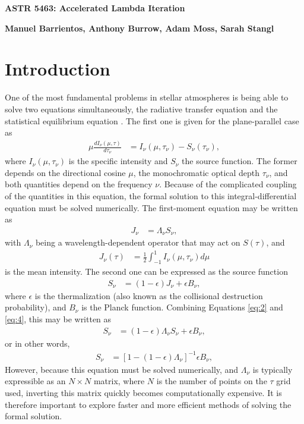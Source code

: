 \documentclass[12pt]{article}
\begin{document}
\begin{center}\begin{LARGE}
\textbf{ASTR 5463: Accelerated Lambda Iteration}
\end{LARGE}\end{center}

\begin{center}
\textbf{Manuel Barrientos, Anthony Burrow, Adam Moss, Sarah Stangl}
\end{center}


\section{Introduction}


One of the most fundamental problems in stellar atmospheres is being able to solve two equations simultaneously, the radiative transfer equation and the statistical equilibrium equation \citep[e.g.,][]{OandK1987,hubeny2003}. The first one is given for the plane-parallel case as
\begin{align}
\mu \frac{d I_\nu(\mu, \tau)}{d \tau_\nu}
&=
I_\nu(\mu, \tau_\nu) - S_\nu(\tau_\nu),
\end{align}
where $I_\nu(\mu, \tau_\nu)$ is the specific intensity and $S_\nu$ the source function. The former depends on the directional cosine $\mu$, the monochromatic optical depth $\tau_\nu$, and both quantities depend on the frequency $\nu$. Because of the complicated coupling of the quantities in this equation, the formal solution to this integral-differential equation must be solved numerically. The first-moment equation may be written as
\begin{align}
J_\nu
&=
\Lambda_\nu S_\nu,
\label{eq:2}
\end{align}
with $\Lambda_\nu$ being a wavelength-dependent operator that may act on $S(\tau)$, and
\begin{align}
J_\nu(\tau)
&=
\frac{1}{2} \int_{-1}^1 I_\nu(\mu, \tau_\nu) d\mu
\end{align}
is the mean intensity. The second one can be expressed as the source function
\begin{align}
S_\nu
&=
(1 - \epsilon) J_\nu + \epsilon B_\nu,
\label{eq:4}
\end{align}
where $\epsilon$ is the thermalization (also known as the collisional destruction probability), and $B_\nu$ is the Planck function. Combining Equations \ref{eq:2} and \ref{eq:4}, this may be written as
\begin{align}
S_\nu
&=
(1 - \epsilon) \Lambda_\nu S_\nu + \epsilon B_\nu,
\end{align}
or in other words,
\begin{align}
S_\nu
&=
[1 - (1 - \epsilon) \Lambda_\nu]^{-1} \epsilon B_\nu,
\end{align}
However, because this equation must be solved numerically, and $\Lambda_\nu$ is typically expressible as an $N \times N$ matrix, where $N$ is the number of points on the $\tau$ grid used, inverting this matrix quickly becomes computationally expensive. It is therefore important to explore faster and more efficient methods of solving the formal solution.
\end{document}
